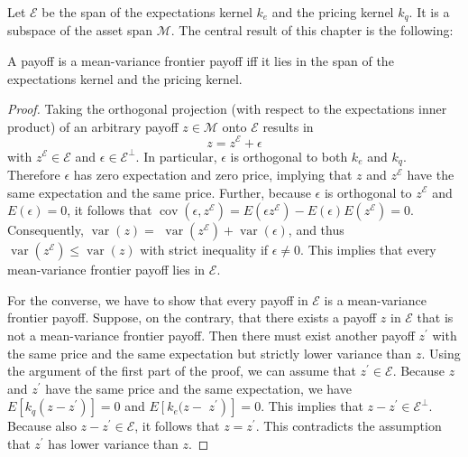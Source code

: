 \documentclass[\topdir/lecture\_notes.tex]{subfiles}
\begin{document}
Let \(\mathcal{E}\) be the span of the expectations kernel \(k_{e}\) and the pricing kernel \(k_{q}\). It is a subspace of the asset span \(\mathcal{M}\). The central result of this chapter is the following:

\begin{theorem} \label{thm:mean_variance_frontier_characterization} A payoff is a mean-variance frontier payoff iff it lies in the span of the expectations kernel and the pricing kernel.
\end{theorem}
\begin{proof}
Taking the orthogonal projection (with respect to the expectations inner product) of an arbitrary payoff \(z \in \mathcal{M}\) onto \(\mathcal{E}\) results in
\begin{equation*}
z=z^{\mathcal{E}}+\epsilon 
\end{equation*}
with \(z^{\mathcal{E}} \in \mathcal{E}\) and \(\epsilon \in \mathcal{E}^{\perp}\). In particular, \(\epsilon\) is orthogonal to both \(k_{e}\) and \(k_{q}\). Therefore \(\epsilon\) has zero expectation and zero price, implying that \(z\) and \(z^{\mathcal{E}}\) have the same expectation and the same price. Further, because \(\epsilon\) is orthogonal to \(z^{\mathcal{E}}\) and \(E(\epsilon)=0\), it follows that \(\operatorname{cov}\left(\epsilon, z^{\mathcal{E}}\right)=E\left(\epsilon z^{\mathcal{E}}\right)-E(\epsilon) E\left(z^{\mathcal{E}}\right)=0\). Consequently, \(\operatorname{var}(z)=\) \(\operatorname{var}\left(z^{\mathcal{E}}\right)+\operatorname{var}(\epsilon)\), and thus \(\operatorname{var}\left(z^{\mathcal{E}}\right) \leq \operatorname{var}(z)\) with strict inequality if \(\epsilon \neq 0\). This implies that every mean-variance frontier payoff lies in \(\mathcal{E}\).

For the converse, we have to show that every payoff in \(\mathcal{E}\) is a mean-variance frontier payoff. Suppose, on the contrary, that there exists a payoff \(z\) in \(\mathcal{E}\) that is not a mean-variance frontier payoff. Then there must exist another payoff \(z^{\prime}\) with the same price and the same expectation but strictly lower variance than \(z\). Using the argument of the first part of the proof, we can assume that \(z^{\prime} \in \mathcal{E}\). Because \(z\) and \(z^{\prime}\) have the same price and the same expectation, we have \(E\left[k_{q}\left(z-z^{\prime}\right)\right]=0\) and \(E\left[k_{e}(z-\right.\) \(\left.\left.z^{\prime}\right)\right]=0\). This implies that \(z-z^{\prime} \in \mathcal{E}^{\perp}\). Because also \(z-z^{\prime} \in \mathcal{E}\), it follows that \(z=z^{\prime}\). This contradicts the assumption that \(z^{\prime}\) has lower variance than \(z\).
\end{proof}
\end{document}
